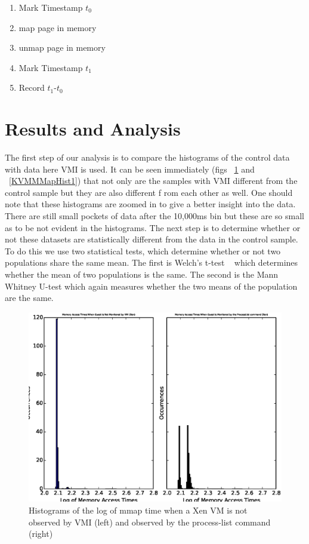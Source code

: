 \begin{enumerate}\label{MMapAlg}
	\item Mark Timestamp $t_0$
	\item map page in memory
	\item unmap page in memory
	\item Mark Timestamp $t_1$
	\item Record $t_1$-$t_0$
\end{enumerate}

\section{Results and Analysis}\label{MMapChap-Results}

The first step of our analysis is to compare the histograms of the control data with data here VMI is used.  It can be seen immediately (figs ~\ref{XenMMapHist1} and ~\ref{KVMMMapHist1}) that not only are the samples with VMI different from the control sample but they are also different f
rom each other as well. One should note that these histograms are zoomed in to give a better insight into the data. There are still small pockets of data after the 10,000ms bin but these are so small as to be not evident in the histograms.  The next step is to determine whether or not these datasets are statistically different from the data in the control sample. To do this we use two statistical tests, which determine whether or not two populations share the same mean. The first is Welch's t-test ~\cite{welch_generalization_1947} which determines whether the mean of two populations is the same. The second is the Mann Whitney U-test which again measures whether the two means of the population are the same.


	\begin{figure}[p!]\label{XenMMapHist1}
	  \centering
	  \includegraphics[width=\textwidth]{figures/XenNoVMIVsProcList.eps}
	  \caption{Histograms of the log of mmap time when a Xen VM is not observed by VMI (left) and observed by the process-list command (right)}
	\end{figure}


